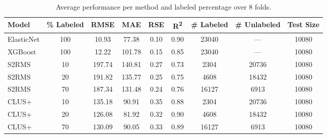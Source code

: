 \begin{table}[ht]
\centering
\caption{Average performance per method and labeled percentage over 8 folds.}
\label{tab:results}
\begin{tabular}{lcccccccc}
\toprule
\textbf{Model} & \textbf{\% Labeled} & \textbf{RMSE} & \textbf{MAE} & \textbf{RSE} & \textbf{R\textsuperscript{2}} & \textbf{\# Labeled} & \textbf{\# Unlabeled} & \textbf{Test Size} \\
\midrule
ElasticNet & 100 & 10.93  & 77.38  & 0.10 & 0.90 & 23040 & ---   & 10080 \\
XGBoost    & 100 & 12.22  & 101.78 & 0.15 & 0.85 & 23040 & ---   & 10080 \\
S2RMS      & 10  & 197.74 & 140.81 & 0.27 & 0.73 & 2304  & 20736 & 10080 \\
S2RMS      & 20  & 191.82 & 135.77 & 0.25 & 0.75 & 4608  & 18432 & 10080 \\
S2RMS      & 70  & 187.34 & 131.48 & 0.24 & 0.76 & 16127 & 6913  & 10080 \\
CLUS+      & 10  & 135.18 & 90.91  & 0.35 & 0.88 & 2304  & 20736 & 10080 \\
CLUS+      & 20  & 126.08 & 81.92  & 0.32 & 0.90 & 4608  & 18432 & 10080 \\
CLUS+      & 70  & 130.09 & 90.05  & 0.33 & 0.89 & 16127 & 6913  & 10080 \\
\bottomrule
\end{tabular}
\end{table}

